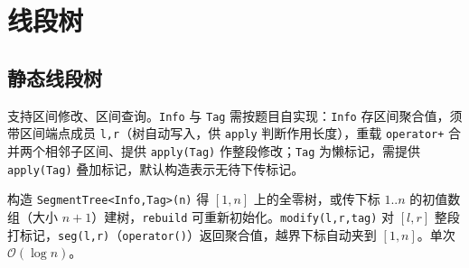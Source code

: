 \section{线段树}

\subsection{静态线段树}

支持区间修改、区间查询。\texttt{Info} 与 \texttt{Tag} 需按题目自实现：\texttt{Info} 存区间聚合值，须带区间端点成员 \texttt{l,r}（树自动写入，供 \texttt{apply} 判断作用长度），重载 \texttt{operator+} 合并两个相邻子区间、提供 \texttt{apply(Tag)} 作整段修改；\texttt{Tag} 为懒标记，需提供 \texttt{apply(Tag)} 叠加标记，默认构造表示无待下传标记。

构造 \texttt{SegmentTree<Info,Tag>(n)} 得 $[1,n]$ 上的全零树，或传下标 $1..n$ 的初值数组（大小 $n+1$）建树，\texttt{rebuild} 可重新初始化。\texttt{modify(l,r,tag)} 对 $[l,r]$ 整段打标记，\texttt{seg(l,r)}（\texttt{operator()}）返回聚合值，越界下标自动夹到 $[1,n]$。单次 $\mathcal{O}(\log n)$。

